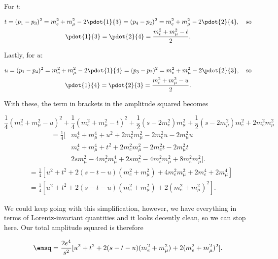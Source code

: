 For $t$:

\begin{gather*}
    t = (p_1 - p_3)^2 = m_e^2 + m_{\mu}^2 - 2\pdot{1}{3} = (p_4 - p_2)^2 = m_e^2 + m_{\mu}^2 - 2\pdot{2}{4}, \quad\mathrm{so} \\
    \pdot{1}{3} = \pdot{2}{4} = \frac{m_e^2 + m_{\mu}^2 - t}{2}.
\end{gather*}

Lastly, for $u$:

\begin{gather*}
    u = (p_1 - p_4)^2 = m_e^2 + m_{\mu}^2 - 2\pdot{1}{4} = (p_3 - p_2)^2 = m_e^2 + m_{\mu}^2 - 2\pdot{2}{3}, \quad\mathrm{so} \\
    \pdot{1}{4} = \pdot{2}{3} = \frac{m_e^2 + m_{\mu}^2 - u}{2}.
\end{gather*}

With these, the term in brackets in the amplitude squared becomes

\begin{equation*}
    \frac{1}{4}(m_e^2 + m_{\mu}^2 - u)^2 + \frac{1}{4}(m_e^2 + m_{\mu}^2 - t)^2 + \frac{1}{2}(s - 2m_e^2)m_{\mu}^2 + \frac{1}{2}(s - 2m_{\mu}^2)m_e^2 + 2m_e^2m_{\mu}^2
\end{equation*}
\begin{align*}
    = \frac{1}{4}[  &m_e^4 + m_{\mu}^4 + u^2 + 2m_e^2m_{\mu}^2 - 2m_e^2u - 2m_{\mu}^2u \\
                    &m_e^4 + m_{\mu}^4 + t^2 + 2m_e^2m_{\mu}^2 - 2m_e^2t - 2m_{\mu}^2t \\
                    & 2sm_{\mu}^2 - 4m_e^2m_{\mu}^4 + 2sm_e^2 - 4m_e^2m_{\mu}^2 + 8m_e^2m_{\mu}^2].
\end{align*}
\begin{align*}
    &= \frac{1}{4}[u^2 + t^2 + 2(s-t-u)(m_e^2 + m_{\mu}^2) + 4m_e^2m_{\mu}^2 + 2m_e^4 + 2m_{\mu}^4] \\
    &= \frac{1}{4}[u^2 + t^2 + 2(s-t-u)(m_e^2 + m_{\mu}^2) + 2(m_e^2 + m_{\mu}^2)^2].
\end{align*}

We could keep going with this simplification, however, we have everything in terms of Lorentz-invariant quantities and it looks decently clean, so we can stop here. Our total amplitude squared is therefore

\begin{equation}
    \emsq = \frac{2e^4}{s^2}[u^2 + t^2 + 2(s-t-u)(m_e^2 + m_{\mu}^2) + 2(m_e^2 + m_{\mu}^2)^2].
\end{equation}

